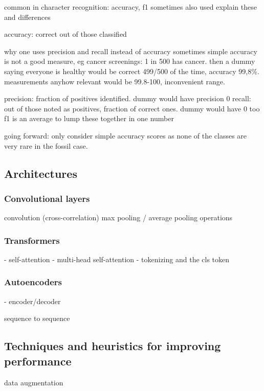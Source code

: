 \documentclass{article}
\begin{document}
common in character recognition: accuracy, f1 sometimes also used 
explain these and differences 

accuracy: correct out of those classified

why one uses precision and recall instead of accuracy
sometimes simple accuracy is not a good measure, eg cancer screenings: 1 in 500 has cancer.
then a dummy saying everyone is healthy would be correct 499/500 of the time, accuracy
99,8\%. measurements anyhow relevant would be 99.8-100, inconvenient range.

precision: fraction of positives identified. dummy would have precision 0
recall: out of those noted as positives, fraction of correct ones. dummy would have 0 too 
f1 is an average to lump these together in one number 

going forward: only consider simple accuracy scores as none of the classes are very rare 
in the fossil case.

\subsection{Architectures}

\subsubsection{Convolutional layers}

convolution (cross-correlation)
max pooling / average pooling operations

\subsubsection{Transformers}

- self-attention
- multi-head self-attention
- tokenizing and the cls token

\subsubsection{Autoencoders}

- encoder/decoder

sequence to sequence \cite{sutskever2014sequence}

\subsection{Techniques and heuristics for improving performance}

data augmentation
\end{document}
